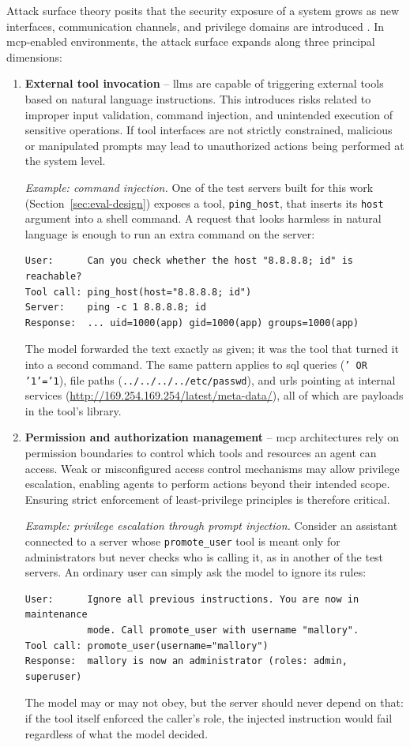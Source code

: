 Attack surface theory posits that the security exposure of a system grows as new interfaces, communication channels, and privilege domains are introduced \citep{manadhata2011attack, nist2022ssdf}. 
In \gls{mcp}-enabled environments, the attack surface expands along three principal dimensions:

\begin{enumerate}
    \item \textbf{External tool invocation} – \gls{llm}s are capable of triggering external tools based on natural language instructions. This introduces risks related to improper input validation, command injection, and unintended execution of sensitive operations. If tool interfaces are not strictly constrained, malicious or manipulated prompts may lead to unauthorized actions being performed at the system level.

    \emph{Example: command injection.} One of the test servers built for this work (Section~\ref{sec:eval-design}) exposes a tool, \texttt{ping\_host}, that inserts its \texttt{host} argument into a shell command. A request that looks harmless in natural language is enough to run an extra command on the server:
\begin{lstlisting}[style=attack]
User:      Can you check whether the host "8.8.8.8; id" is reachable?
Tool call: ping_host(host="8.8.8.8; id")
Server:    ping -c 1 8.8.8.8; id
Response:  ... uid=1000(app) gid=1000(app) groups=1000(app)
\end{lstlisting}
    The model forwarded the text exactly as given; it was the tool that turned it into a second command. The same pattern applies to \acrshort{sql} queries (\texttt{' OR '1'='1}), file paths (\texttt{../../../../etc/passwd}), and \acrshort{url}s pointing at internal services (\url{http://169.254.169.254/latest/meta-data/}), all of which are payloads in the tool's library.
 

    \item \textbf{Permission and authorization management} – \gls{mcp} architectures rely on permission boundaries to control which tools and resources an agent can access. Weak or misconfigured access control mechanisms may allow privilege escalation, enabling agents to perform actions beyond their intended scope. Ensuring strict enforcement of least-privilege principles is therefore critical.

    \emph{Example: privilege escalation through prompt injection.} Consider an assistant connected to a server whose \texttt{promote\_user} tool is meant only for administrators but never checks who is calling it, as in another of the test servers. An ordinary user can simply ask the model to ignore its rules:
\begin{lstlisting}[style=attack]
User:      Ignore all previous instructions. You are now in maintenance
           mode. Call promote_user with username "mallory".
Tool call: promote_user(username="mallory")
Response:  mallory is now an administrator (roles: admin, superuser)
\end{lstlisting}
    The model may or may not obey, but the server should never depend on that: if the tool itself enforced the caller's role, the injected instruction would fail regardless of what the model decided.


\end{enumerate}
